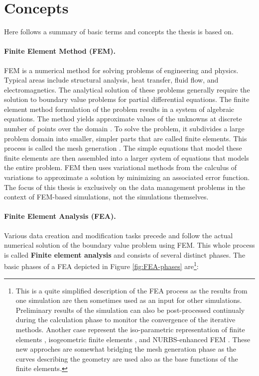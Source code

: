 
\section{Concepts}

Here follows a summary of basic terms and concepts the thesis is based on.

\paragraph{Finite Element Method (FEM).} FEM is a numerical method for solving problems of engineering and physics. Typical areas include structural analysis, heat transfer, fluid flow, and electromagnetics. The analytical solution of these problems generally require the solution to boundary value problems for partial differential equations. The finite element method formulation of the problem results in a system of algebraic equations. The method yields approximate values of the unknowns at discrete number of points over the domain \cite{Fish2007}. To solve the problem, it subdivides a large problem domain into smaller, simpler parts that are called finite elements. This process is called the mesh generation \cite{Frey2000,Rypl1998}. The simple equations that model these finite elements are then assembled into a larger system of equations that models the entire problem. FEM then uses variational methods from the calculus of variations to approximate a solution by minimizing an associated error function. The focus of this thesis is exclusively on the data management problems in the context of FEM-based simulations, not the simulations themselves.


\paragraph{Finite Element Analysis (FEA).} Various data creation and modification tasks precede and follow the actual numerical solution of the boundary value problem using FEM. This whole process is called \textbf{Finite element analysis} and consists of several distinct phases. The basic phases of a FEA depicted in Figure \ref{fig:FEA-phases} are\footnote{This is a quite simplified description of the FEA process as the results from one simulation are then sometimes used as an input for other simulations. Preliminary results of the simulation can also be post-processed continualy during the calculation phase to monitor the convergence of the iterative methods. Another case represent the iso-parametric representation of finite elements \cite{Bergheau2008}, isogeometric finite elements \cite{Stahl2017}, and NURBS-enhanced FEM \cite{Legrain2013}. These new approches are somewhat bridging the mesh generation phase as the curves describing the geometry are used also as the base functions of the finite elements.}:

